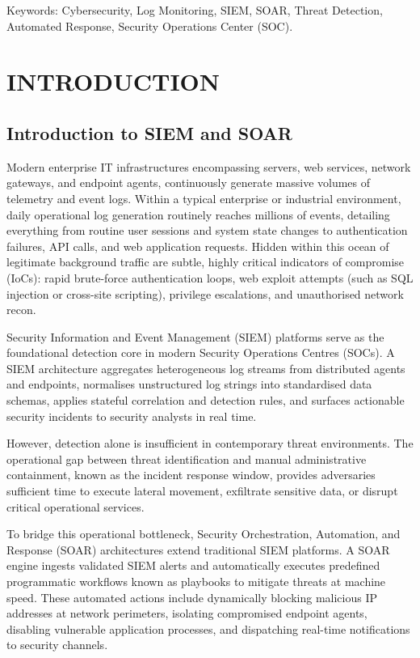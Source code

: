 Keywords: Cybersecurity, Log Monitoring, SIEM, SOAR, Threat Detection, Automated Response, Security Operations Center (SOC).

\newpage
\chapter{INTRODUCTION}

\section{Introduction to SIEM and SOAR}

Modern enterprise IT infrastructures encompassing servers, web services, network gateways, and endpoint agents, continuously generate massive volumes of telemetry and event logs. Within a typical enterprise or industrial environment, daily operational log generation routinely reaches millions of events, detailing everything from routine user sessions and system state changes to authentication failures, API calls, and web application requests. Hidden within this ocean of legitimate background traffic are subtle, highly critical indicators of compromise (IoCs): rapid brute-force authentication loops, web exploit attempts (such as SQL injection or cross-site scripting), privilege escalations, and unauthorised network recon.

Security Information and Event Management (SIEM) platforms serve as the foundational detection core in modern Security Operations Centres (SOCs). A SIEM architecture aggregates heterogeneous log streams from distributed agents and endpoints, normalises unstructured log strings into standardised data schemas, applies stateful correlation and detection rules, and surfaces actionable security incidents to security analysts in real time.

However, detection alone is insufficient in contemporary threat environments. The operational gap between threat identification and manual administrative containment, known as the incident response window, provides adversaries sufficient time to execute lateral movement, exfiltrate sensitive data, or disrupt critical operational services.

To bridge this operational bottleneck, Security Orchestration, Automation, and Response (SOAR) architectures extend traditional SIEM platforms. A SOAR engine ingests validated SIEM alerts and automatically executes predefined programmatic workflows known as playbooks to mitigate threats at machine speed. These automated actions include dynamically blocking malicious IP addresses at network perimeters, isolating compromised endpoint agents, disabling vulnerable application processes, and dispatching real-time notifications to security channels.

